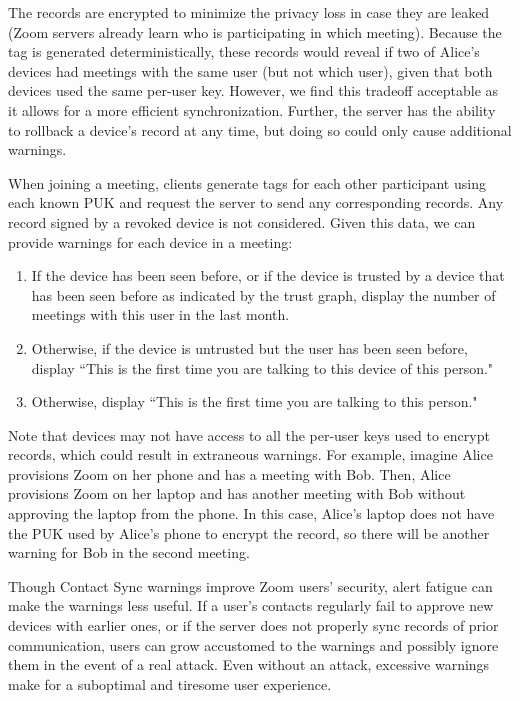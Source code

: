 The records are encrypted to minimize the privacy loss in case they are leaked (Zoom servers already
learn who is participating in which meeting). Because the tag is generated deterministically, these
records would reveal if two of Alice's devices had meetings with the same user (but not which user),
given that both devices used the same per-user key. However, we find this tradeoff acceptable as it
allows for a more efficient synchronization. Further, the server has the ability to rollback a
device's record at any time, but doing so could only cause additional warnings.

When joining a meeting, clients generate tags for each other participant using each known PUK and
request the server to send any corresponding records. Any record signed by a revoked device is not
considered. Given this data, we can provide warnings for each device in a meeting:
\begin{enumerate}
\item If the device has been seen before, or if the device is trusted by a device that has been seen
    before as indicated by the trust graph, display the number of meetings with this user in the
    last month.
\item Otherwise, if the device is untrusted but the user has been seen before, display ``This is the
    first time you are talking to this device of this person."
\item Otherwise, display ``This is the first time you are talking to this person."
\end{enumerate}

Note that devices may not have access to all the per-user keys used to encrypt records, which could
result in extraneous warnings. For example, imagine Alice provisions Zoom on her phone and has a
meeting with Bob. Then, Alice provisions Zoom on her laptop and has another meeting with Bob without
approving the laptop from the phone. In this case, Alice's laptop does not have the PUK used by
Alice's phone to encrypt the record, so there will be another warning for Bob in the second meeting.

Though Contact Sync warnings improve Zoom users' security, alert fatigue can make the warnings less
useful. If a user's contacts regularly fail to approve new devices with earlier ones, or if the
server does not properly sync records of prior communication, users can grow accustomed to the
warnings and possibly ignore them in the event of a real attack. Even without an attack, excessive
warnings make for a suboptimal and tiresome user experience.
